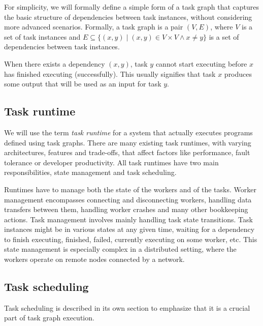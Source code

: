 For simplicity, we will formally define a simple form of a task graph that captures the basic
structure of dependencies between task instances, without considering more advanced scenarios.
Formally, a task graph is a pair $(V, E)$, where $V$ is a set of task instances and
$E \subseteq \{(x, y) \mid (x, y) \in V\times{}V \land x \neq y \}$ is a set of dependencies
between task instances.

When there exists a dependency $(x, y)$, task $y$ cannot start executing before $x$ has finished
executing (successfully). This usually signifies that task $x$ produces some output that will be
used as an input for task $y$.


\subsection{Task runtime}
We will use the term \emph{task runtime} for a system that actually executes programs defined using
task graphs. There are many existing task runtimes, with varying architectures, features and
trade-offs, that affect factors like performance, fault tolerance or developer productivity.
All task runtimes have two main responsibilities, state management and task scheduling.

Runtimes have to manage both the state of the workers and of the tasks. Worker management
encompasses connecting and disconnecting workers, handling data transfers between them,
handling worker crashes and many other bookkeeping actions. Task management involves
mainly handling task state transitions. Task instances might be in various states at any given
time, waiting for a dependency to finish executing, finished, failed, currently executing on
some worker, etc. This state management is especially complex in a distributed setting, where the
workers operate on remote nodes connected by a network.

\subsection{Task scheduling}
Task scheduling is described in its own section to emphasize that it is a crucial part of task
graph execution.

